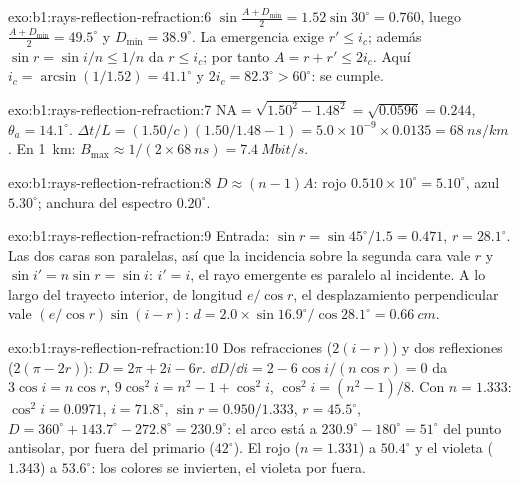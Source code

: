 \begin{solution}{exo:b1:rays-reflection-refraction:6}
$\sin\frac{A + D_{\min}}{2} = 1.52\sin 30^\circ = 0.760$, luego
$\frac{A + D_{\min}}{2} = 49.5^\circ$ y $D_{\min} = 38.9^\circ$.
La emergencia exige $r' \leq i_c$; además $\sin r = \sin i/n \leq 1/n$ da
$r \leq i_c$; por tanto $A = r + r' \leq 2i_c$. Aquí $i_c = \arcsin(1/1.52) =
41.1^\circ$ y $2i_c = 82.3^\circ > 60^\circ$: se cumple.
\end{solution}

\begin{solution}{exo:b1:rays-reflection-refraction:7}
$\mathrm{NA} = \sqrt{1.50^2 - 1.48^2} = \sqrt{0.0596} = 0.244$,
$\theta_a = 14.1^\circ$. $\Delta t/L = (1.50/c)(1.50/1.48 - 1) =
5.0\times10^{-9} \times 0.0135 = \qty{68}{ns/km}$. En \qty{1}{km}:
$B_{\max} \approx 1/(2 \times \qty{68}{ns}) = \qty{7.4}{Mbit/s}$.
\end{solution}

\begin{solution}{exo:b1:rays-reflection-refraction:8}
$D \approx (n - 1)A$: rojo $0.510 \times 10^\circ = 5.10^\circ$, azul
$5.30^\circ$; anchura del espectro $0.20^\circ$.
\end{solution}

\begin{solution}{exo:b1:rays-reflection-refraction:9}
Entrada: $\sin r = \sin 45^\circ/1.5 = 0.471$, $r = 28.1^\circ$. Las dos
caras son paralelas, así que la incidencia sobre la segunda cara vale $r$ y
$\sin i' = n\sin r = \sin i$: $i' = i$, el rayo emergente es paralelo al
incidente. A lo largo del trayecto interior, de longitud $e/\cos r$, el
desplazamiento perpendicular vale $(e/\cos r)\sin(i - r)$:
$d = 2.0 \times \sin 16.9^\circ/\cos 28.1^\circ = \qty{0.66}{cm}$.
\end{solution}

\begin{solution}{exo:b1:rays-reflection-refraction:10}
Dos refracciones ($2(i - r)$) y dos reflexiones ($2(\pi - 2r)$):
$D = 2\pi + 2i - 6r$. $\dd D/\dd i = 2 - 6\cos i/(n\cos r) = 0$ da
$3\cos i = n\cos r$, $9\cos^2 i = n^2 - 1 + \cos^2 i$, $\cos^2 i =
(n^2 - 1)/8$. Con $n = 1.333$: $\cos^2 i = 0.0971$, $i = 71.8^\circ$,
$\sin r = 0.950/1.333$, $r = 45.5^\circ$, $D = 360^\circ + 143.7^\circ -
272.8^\circ = 230.9^\circ$: el arco está a $230.9^\circ - 180^\circ =
51^\circ$ del punto antisolar, por fuera del primario ($42^\circ$).
El rojo ($n = 1.331$) a $50.4^\circ$ y el violeta ($1.343$) a $53.6^\circ$:
los colores se invierten, el violeta por fuera.
\end{solution}

